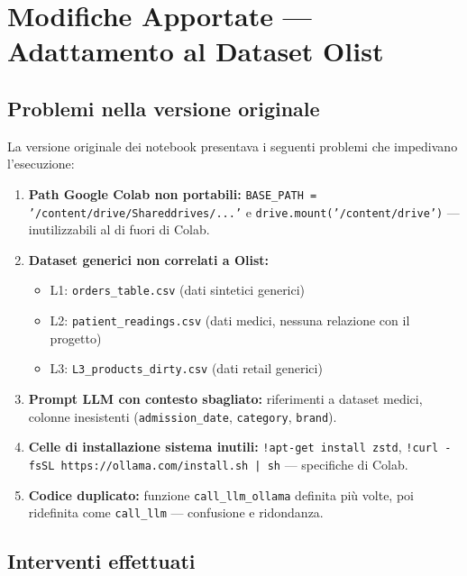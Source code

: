 \documentclass[12pt,a4paper]{article}
\begin{document}
\section{Modifiche Apportate — Adattamento al Dataset Olist}

\subsection{Problemi nella versione originale}

La versione originale dei notebook presentava i seguenti problemi che
impedivano l'esecuzione:

\begin{enumerate}
  \item \textbf{Path Google Colab non portabili:}
        \texttt{BASE\_PATH = '/content/drive/Shareddrives/...'} e
        \texttt{drive.mount('/content/drive')} — inutilizzabili al di fuori di Colab.
  \item \textbf{Dataset generici non correlati a Olist:}
        \begin{itemize}
          \item L1: \texttt{orders\_table.csv} (dati sintetici generici)
          \item L2: \texttt{patient\_readings.csv} (dati medici, nessuna relazione con il progetto)
          \item L3: \texttt{L3\_products\_dirty.csv} (dati retail generici)
        \end{itemize}
  \item \textbf{Prompt LLM con contesto sbagliato:} riferimenti a dataset medici,
        colonne inesistenti (\texttt{admission\_date}, \texttt{category}, \texttt{brand}).
  \item \textbf{Celle di installazione sistema inutili:} \texttt{!apt-get install zstd},
        \texttt{!curl -fsSL https://ollama.com/install.sh | sh} — specifiche di Colab.
  \item \textbf{Codice duplicato:} funzione \texttt{call\_llm\_ollama} definita più volte,
        poi ridefinita come \texttt{call\_llm} — confusione e ridondanza.
\end{enumerate}

\subsection{Interventi effettuati}
\end{document}
